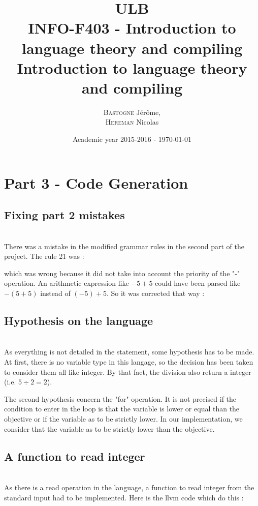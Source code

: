 \documentclass[a4paper,10pt]{report}
\title{ULB\\
        INFO-F403 - Introduction to language theory and compiling \\
            Introduction to language theory and compiling}
\author{\textsc{Bastogne} Jérôme,\\
        \textsc{Hereman} Nicolas}
\date{Academic year 2015-2016 - \today}
\begin{document}
\maketitle
\clearpage


\chapter*{Part 3 - Code Generation}

\section*{Fixing part 2 mistakes}

\hfill \\
There was a mistake in the modified grammar rules in the second part of the project. The rule 21 was :

which was wrong because it did not take into account the priority of the "-" operation. An arithmetic expression like $-5+5$ could have been parsed like $-(5+5)$ instead of $(-5) + 5$. So it was corrected that way :


\section*{Hypothesis on the language}

\hfill \\
As everything is not detailed in the statement, some hypothesis has to be made. At first, there is no variable type in this langage, so the decision has been taken to consider them all like integer. By that fact, the division also return a integer (i.e. $5\div2=2$).

The second hypothesis concern the "for" operation. It is not precised if the condition to enter in the loop is that the variable is lower or equal than the objective or if the variable as to be strictly lower. In our implementation, we consider that the variable as to be strictly lower than the objective.

\section*{A function to read integer}

\hfill \\
As there is a read operation in the language, a function to read integer from the standard input had to be implemented. Here is the llvm code which do this :
\end{document}
